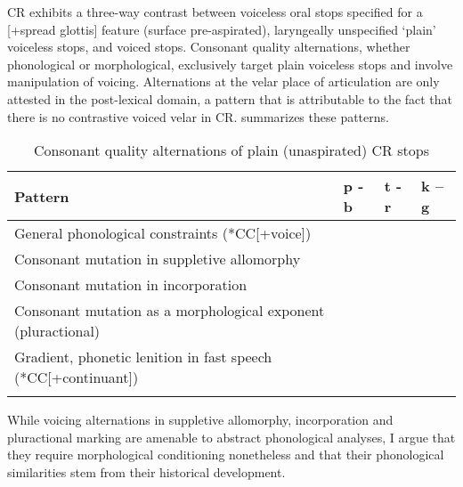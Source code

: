 CR exhibits a three-way contrast between voiceless oral stops specified for a [+spread glottis] feature (surface pre-aspirated), laryngeally unspecified ‘plain’ voiceless stops, and voiced stops. Consonant quality alternations, whether phonological or morphological, exclusively target plain voiceless stops and involve manipulation of voicing. Alternations at the velar place of articulation are only attested in the post-lexical domain, a pattern that is attributable to the fact that there is no contrastive voiced velar in CR.  summarizes these patterns.

\begin{table}
\begin{tabularx}{\textwidth}{Qlll}
\lsptoprule
Pattern	& p - b &	t - r	& k – g\\
\midrule
General phonological constraints (*CC[+voice]) &	&	&	\\
Consonant mutation in suppletive allomorphy	& &	&	\\
Consonant mutation in incorporation	&	&	&\\
Consonant mutation as a morphological exponent (pluractional)	&	&&	\\
Gradient, phonetic lenition in fast speech (*CC[+continuant])&	&	&	\\
\lspbottomrule
\end{tabularx}
\caption{Consonant quality alternations of plain (unaspirated) CR stops}
\label{tab:23:3}
\end{table}

While voicing alternations in suppletive allomorphy, incorporation and pluractional marking are amenable to abstract phonological analyses, I argue that they require morphological conditioning nonetheless and that their phonological similarities stem from their historical development.

